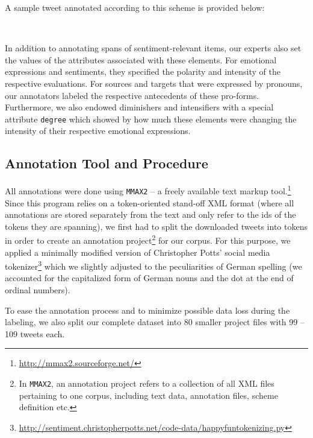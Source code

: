 \noindent{}A sample tweet annotated according to this scheme is
provided below:
\begin{example}
\upshape{}\\[0.8em]
\noindent{}
\end{example}
In addition to annotating spans of sentiment-relevant items, our
experts also set the values of the attributes associated with these
elements. For emotional expressions and sentiments, they specified the
polarity and intensity of the respective evaluations.  For sources and
targets that were expressed by pronouns, our annotators labeled the
respective antecedents of these pro-forms.  Furthermore, we also
endowed diminishers and intensifiers with a special attribute
\texttt{degree} which showed by how much these elements were changing
the intensity of their respective emotional expressions.

\subsection{Annotation Tool and Procedure}\label{subsec:snt:tformat}
All annotations were done using \texttt{MMAX2} -- a freely available
text markup tool.\footnote{\url{http://mmax2.sourceforge.net/}} Since
this program relies on a token-oriented stand-off XML format (where
all annotations are stored separately from the text and only refer to
the ids of the tokens they are spanning), we first had to split the
downloaded tweets into tokens in order to create an annotation
project\footnote{In \texttt{MMAX2}, an annotation project refers to a
  collection of all XML files pertaining to one corpus, including text
  data, annotation files, scheme definition etc.}
for our corpus.  For this purpose, we applied a minimally modified
version of Christopher Potts' social media
tokenizer\footnote{\url{http://sentiment.christopherpotts.net/code-data/happyfuntokenizing.py}}
which we slightly adjusted to the peculiarities of German spelling (we
accounted for the capitalized form of German nouns and the dot at the
end of ordinal numbers).

To ease the annotation process and to minimize possible data loss
during the labeling, we also split our complete dataset into 80
smaller project files with 99 -- 109 tweets each.

